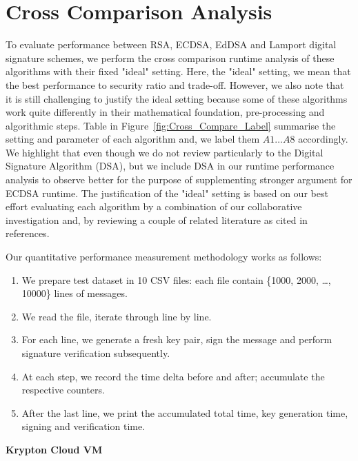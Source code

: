 \documentclass[10pt,sigconf]{acmart}
\begin{document}
\section{Cross Comparison Analysis}

To evaluate performance between RSA, ECDSA, EdDSA and Lamport digital signature schemes, we perform the cross comparison runtime analysis of these algorithms with their fixed "ideal" setting. Here, the "ideal" setting, we mean that the best performance to security ratio and trade-off. However, we also note that it is still challenging to justify the ideal setting because some of these algorithms work quite differently in their mathematical foundation, pre-processing and algorithmic steps. Table in Figure~\ref{fig:Cross_Compare_Label} summarise the setting and parameter of each algorithm and, we label them $A1 \dots A8$ accordingly. We highlight that even though we do not review particularly to the Digital Signature Algorithm (DSA), but we include DSA in our runtime performance analysis to observe better for the purpose of supplementing stronger argument for ECDSA runtime. The justification of the "ideal" setting is based on our best effort evaluating each algorithm by a combination of our collaborative investigation and, by reviewing a couple of related literature as cited in references.

\vspace{0.5em}

\noindent Our quantitative performance measurement methodology works as follows:

\begin{enumerate}
    \item We prepare test dataset in 10 CSV files: each file contain \{1000, 2000, \dots, 10000\} lines of messages.
    \item We read the file, iterate through line by line.
    \item For each line, we generate a fresh key pair, sign the message and perform signature verification subsequently.
    \item At each step, we record the time delta before and after; accumulate the respective counters.
    \item After the last line, we print the accumulated total time, key generation time, signing and verification time.
\end{enumerate}

\vspace{0.5em}

\noindent \textbf{Krypton Cloud VM}
\end{document}
